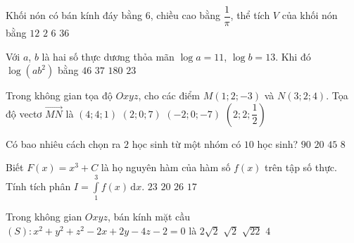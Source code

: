 \begin{ex}%
	Khối nón có bán kính đáy bằng $6$, chiều cao bằng $\dfrac{1}{\pi}$, thể tích $V$ của khối nón bằng
	\choice
	{\True $12$}
	{$2$}
	{$6$}
	{$36$}
\end{ex}
\begin{ex}%
	Với $a$, $b$ là hai số thực dương thỏa mãn $\log a=11$, $\log b=13$. Khi đó $\log\left(ab^2\right)$ bằng
	\choice
	{$46$}
	{\True $37$}
	{$180$}
	{$23$}
\end{ex}
\begin{ex}%
	Trong không gian tọa độ $Oxyz$, cho các điểm $M(1;2;-3)$ và $N(3;2;4)$. Tọa độ vectơ $\overrightarrow{MN}$ là
	\choice
	{$(4;4;1)$}
	{\True $(2;0;7)$}
	{$(-2;0;-7)$}
	{$\left(2;2;\dfrac{1}{2}\right)$}
\end{ex}
\begin{ex}%
	Có bao nhiêu cách chọn ra $2$ học sinh từ một nhóm có $10$ học sinh?
	\choice
	{$90$}
	{$20$}
	{\True $45$}
	{$8$}
\end{ex}
\begin{ex}%
	Biết $F(x)=x^3+C$ là họ nguyên hàm của hàm số $f(x)$ trên tập số thực. Tính tích phân $I=\displaystyle\int\limits_1^3f(x)\mathrm{\,d}x$.
	\choice
	{$23$}
	{$20$}
	{\True $26$}
	{$17$}
\end{ex}
\begin{ex}%
	Trong không gian $Oxyz$, bán kính mặt cầu $(S)\colon x^2+y^2+z^2-2x+2y-4z-2=0$ là
	\choice
	{\True $2\sqrt{2}$}
	{$\sqrt{2}$}
	{$\sqrt{22}$}
	{$4$}
\end{ex}
